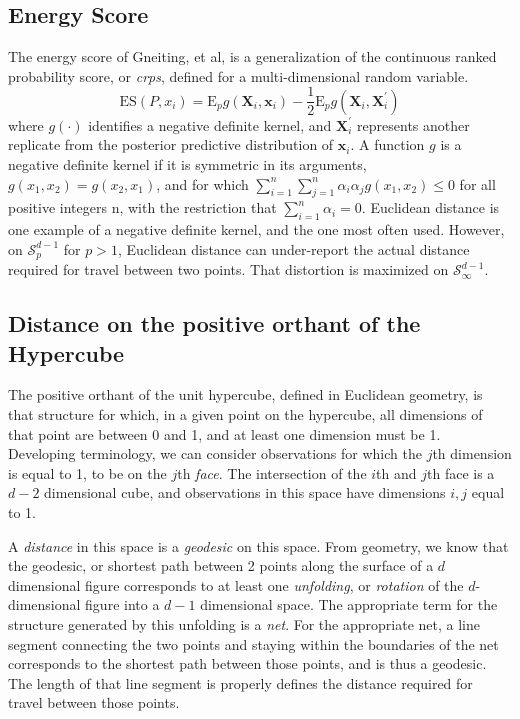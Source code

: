 \subsection{Energy Score}
The energy score of Gneiting, et al\cite{gneiting2007}, is a generalization of the continuous ranked
  probability score, or \emph{crps}, defined for a multi-dimensional random variable.
  \begin{equation}
    \label{eq:es}
    \text{ES}\left(P,x_i\right) =  \text{E}_p g\left(\bm{X}_i, \bm{x}_i\right) - \frac{1}{2}\text{E}_p g\left(\bm{X}_i,\bm{X}_i^{\prime}\right)
  \end{equation}
  where $g(\cdot)$ identifies a negative definite kernel, and $\bm{X}_i^{\prime}$ represents another
  replicate from the posterior predictive distribution of $\bm{x}_i$. A function $g$ is a negative definite kernel if it is symmetric in its arguments, $g(x_1,x_2) = g(x_2,x_1)$, and for which
  $\sum_{i =1}^n\sum_{j=1}^n\alpha_i\alpha_jg(x_1,x_2) \leq 0$ for all positive integers n, with the
  restriction that $\sum_{i=1}^n\alpha_i = 0$.  Euclidean distance is one example of a negative definite kernel,
  and the one most often used.  However,   on $\mathcal{S}_p^{d-1}$ for $p > 1$, Euclidean distance
  can under-report the actual distance required for travel between two points. That distortion is 
  maximized on $\mathcal{S}_{\infty}^{d-1}$.

\subsection{Distance on the positive orthant of the Hypercube}
  \label{subsec:distance}
The positive orthant of the unit hypercube, defined in Euclidean geometry, is that structure for
  which, in a given point on the hypercube, all dimensions of that point are between 0 and 1, and
  at least one dimension must be 1.  Developing terminology, we can consider observations for which
  the $j$th dimension is equal to 1, to be on the $j$th \emph{face}.  The intersection of the $i$th
  and $j$th face is a $d-2$ dimensional cube, and observations in this space have dimensions $i,j$
  equal to 1.

A \emph{distance} in this space is a \emph{geodesic} on this space. From geometry, we know that
  the geodesic, or shortest path between 2 points along the surface of a $d$ dimensional figure
  corresponds to at least one \emph{unfolding}, or \emph{rotation} of the $d$-dimensional
  figure into a $d-1$ dimensional space.  The appropriate term for the structure generated by this
  unfolding is a \emph{net}.  For the appropriate net, a line segment connecting the two points and
  staying within the boundaries of the net corresponds to the shortest path between those points\citep{pappas1989}, and is thus a geodesic.  The length of that line segment is properly
  defines the distance required for travel between those points.

